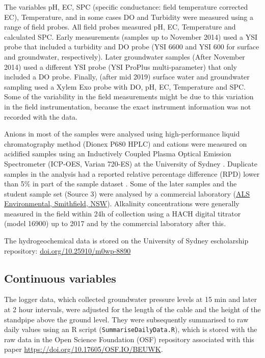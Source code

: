 \documentclass[, manuscript]{copernicus}
\begin{document}
The variables pH, EC, SPC (specific conductance: field temperature
corrected EC), Temperature, and in some cases DO and Turbidity were
measured using a range of field probes. All field probes measured pH,
EC, Temperature and calculated SPC. Early measurements (samples up to
November 2014) used a YSI probe that included a turbidity and DO probe
(YSI 6600 and YSI 600 for surface and groundwater, respectively). Later
groundwater samples (After November 2014) used a different YSI probe
(YSI ProPlus multi-parameter) that only included a DO probe. Finally,
(after mid 2019) surface water and groundwater sampling used a Xylem Exo
probe with DO, pH, EC, Temperature and SPC. Some of the variability in
the field measurements might be due to this variation in the field
instrumentation, because the exact instrument information was not
recorded with the data.

Anions in most of the samples were analysed using high-performance
liquid chromatography method (Dionex P680 HPLC) and cations were
measured on acidified samples using an Inductively Coupled Plasma
Optical Emission Spectrometer (ICP-OES, Varian 720-ES) at the University
of Sydney \citep{Akter2018}. Duplicate samples in the analysis had a
reported relative percentage difference (RPD) lower than 5\% in part of
the sample dataset \citep{Akter2018}. Some of the later samples and the
student sample set (Source 3) were analysed by a commercial laboratory
(\href{https://www.alsglobal.com/en/locations/asia-pacific/pacific/australia/nsw/sydney-woodpark-environmental}{ALS
Environmental, Smithfield, NSW}). Alkalinity concentrations were
generally measured in the field within 24h of collection using a HACH
digital titrator (model 16900) \citep{Akter2018} up to 2017 and by the
commercial laboratory after this.

The hydrogeochemical data is stored on the University of Sydney
escholarship repository: \url{doi.org/10.25910/m0wp-8890}

\subsection{Continuous variables}

The logger data, which collected groundwater pressure levels at 15 min
and later at 2 hour intervals, were adjusted for the length of the cable
and the height of the standpipe above the ground level. They were
subsequently summarised to raw daily values using an R script
(\texttt{SummariseDailyData.R}), which is stored with the raw data in
the Open Science Foundation (OSF) repository associated with this paper
\url{https://doi.org/10.17605/OSF.IO/BEUWK}.
\end{document}
